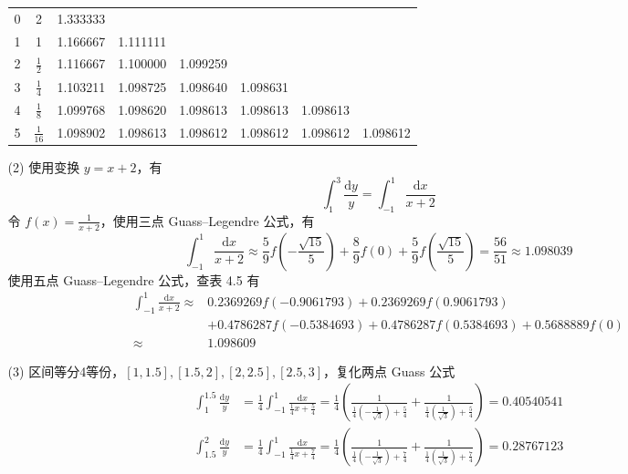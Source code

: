 \documentclass{sjtuarticle}
\def\dd{\mathrm{d}}
\begin{document}
\begin{itemize}
\begin{solution}
\begin{itemize}
\begin{center}
\begin{tabular}{cccccccc}
            \midrule
            0  & 2	& 1.333333 \\
            1  & 1  & 1.166667&	1.111111	\\
            2 &	$\frac12$    &  1.116667	&1.100000 &	1.099259	 \\
            3 &	$\frac14$    & 1.103211 &	1.098725	& 1.098640 &	1.098631	\\
            4 &	$\frac18$    & 1.099768	& 1.098620	& 1.098613	& 1.098613	& 1.098613 \\	
            5 &	$\frac1{16}$ &     1.098902	& 1.098613	& 1.098612	& 1.098612	& 1.098612	& 1.098612 \\
            \bottomrule
            \end{tabular}
            \end{center}
            \item[(2)]使用变换 $y=x+2$，有
            \begin{equation*}
                \int_1^3 \frac{\dd y}{y} = \int_{-1}^1 \frac{\dd x}{x+2}
            \end{equation*}
            令 $f(x)=\frac{1}{x+2}$，使用三点 Guass--Legendre 公式，有
            \begin{equation*}
                \int_{-1}^1 \frac{\dd x}{x+2} \approx \frac{5}{9} f\left(-\frac{\sqrt{15}}{5}\right)+\frac{8}{9}f(0)+\frac{5}{9}f\left(\frac{\sqrt{15}}{5}\right)=\frac{56}{51}\approx 1.098039
            \end{equation*}
            使用五点 Guass--Legendre 公式，查表 4.5 有
            \begin{align*}
                \int_{-1}^1 \frac{\dd x}{x+2} \approx& 0.2369269f(-0.9061793)+0.2369269f(0.9061793)\\
                &+0.4786287f(-0.5384693)+0.4786287f(0.5384693)+0.5688889f(0)\\
                \approx& 1.098609
            \end{align*}
            \item[(3)] 区间等分4等份，$[1,1.5],[1.5,2],[2,2.5],[2.5,3]$，复化两点 Guass 公式
            \begin{align*}
                \int_{1}^{1.5} \frac{\dd y}{y}&=\frac{1}{4}\int_{-1}^1 \frac{\dd x}{\frac{1}{4}x+\frac{5}{4}}=\frac{1}{4}\left(\frac{1}{\frac{1}{4}\left(-\frac{1}{\sqrt{3}}\right)+\frac{5}{4}}+\frac{1}{\frac{1}{4}\left(\frac{1}{\sqrt{3}}\right)+\frac{5}{4}}\right)=0.40540541\\
                \int_{1.5}^2 \frac{\dd y}{y}&=\frac{1}{4}\int_{-1}^1 \frac{\dd x}{\frac{1}{4}x+\frac{7}{4}}=\frac{1}{4}\left(\frac{1}{\frac{1}{4}\left(-\frac{1}{\sqrt{3}}\right)+\frac{7}{4}}+\frac{1}{\frac{1}{4}\left(\frac{1}{\sqrt{3}}\right)+\frac{7}{4}}\right)=0.28767123\\

\end{align*}
\end{itemize}
\end{solution}
\end{itemize}
\end{document}
